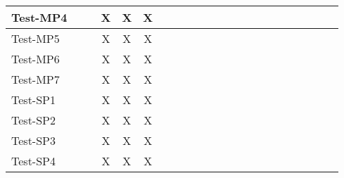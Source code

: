 \documentclass[12pt, titlepage]{article}
\begin{document}
\begin{landscape}
\begin{table}[H]
\begin{adjustwidth}{-0.1in}{-1in}
{\begin{tabular}{|c|c|c|c|c|c|c|c|c|c|c|c|c|c|c|c|c|c|c|c|c|c|}
\multicolumn{1}{|l|}{{Test-MP4}}  &             &              &      X       &     X         &   X          &             &             &             &              &              &             &             &              &             &              &                & & & & &\\ \hline
\multicolumn{1}{|l|}{{Test-MP5}}  &             &              &      X       &     X         &   X          &             &             &             &              &              &             &             &              &             &              &                & & & & &\\ \hline
\multicolumn{1}{|l|}{{Test-MP6}}  &             &              &      X       &     X         &   X          &             &             &             &              &              &             &             &              &             &              &                & & & & &\\ \hline
\multicolumn{1}{|l|}{{Test-MP7}}  &             &              &      X       &     X         &   X          &             &             &             &              &              &             &             &              &             &              &                & & & & &\\ \hline
\multicolumn{1}{|l|}{{Test-SP1}} &             &              &      X       &     X         &   X          &             &             &             &              &              &             &             &              &             &              &                & & & & &\\ \hline
\multicolumn{1}{|l|}{{Test-SP2}}  &             &              &      X       &     X         &   X          &             &             &             &              &              &             &             &              &             &              &                & & & & &\\ \hline
\multicolumn{1}{|l|}{{Test-SP3}}  &             &              &      X       &     X         &   X          &             &             &             &              &              &             &             &              &             &              &                & & & & &\\ \hline
\multicolumn{1}{|l|}{{Test-SP4}}  &             &              &      X       &     X         &   X          &             &             &             &              &              &             &             &              &             &              &                & & & & &\\ \hline

\end{tabular}}
\end{adjustwidth}
\end{table}
\end{landscape}
\end{document}

